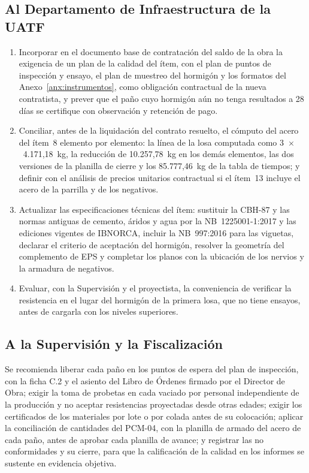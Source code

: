 \subsection{Al Departamento de Infraestructura de la UATF}
\begin{enumerate}[label=(\arabic*)]
  \item Incorporar en el documento base de contratación del saldo de la obra la exigencia de un plan de la calidad del ítem, con el plan de puntos de inspección y ensayo, el plan de muestreo del hormigón y los formatos del Anexo~\ref{anx:instrumentos}, como obligación contractual de la nueva contratista, y prever que el paño cuyo hormigón aún no tenga resultados a 28 días se certifique con observación y retención de pago.
  \item Conciliar, antes de la liquidación del contrato resuelto, el cómputo del acero del ítem~8 elemento por elemento: la línea de la losa computada como 3~$\times$~4.171,18~kg, la reducción de 10.257,78~kg en los demás elementos, las dos versiones de la planilla de cierre y los 85.777,46~kg de la tabla de tiempos; y definir con el análisis de precios unitarios contractual si el ítem~13 incluye el acero de la parrilla y de los negativos.
  \item Actualizar las especificaciones técnicas del ítem: sustituir la CBH-87 y las normas antiguas de cemento, áridos y agua por la NB~1225001-1:2017 y las ediciones vigentes de IBNORCA, incluir la NB~997:2016 para las viguetas, declarar el criterio de aceptación del hormigón, resolver la geometría del complemento de EPS y completar los planos con la ubicación de los nervios y la armadura de negativos.
  \item Evaluar, con la Supervisión y el proyectista, la conveniencia de verificar la resistencia en el lugar del hormigón de la primera losa, que no tiene ensayos, antes de cargarla con los niveles superiores.
\end{enumerate}

\subsection{A la Supervisión y la Fiscalización}
Se recomienda liberar cada paño en los puntos de espera del plan de inspección, con la ficha C.2 y el asiento del Libro de Órdenes firmado por el Director de Obra; exigir la toma de probetas en cada vaciado por personal independiente de la producción y no aceptar resistencias proyectadas desde otras edades; exigir los certificados de los materiales por lote o por colada antes de su colocación; aplicar la conciliación de cantidades del PCM-04, con la planilla de armado del acero de cada paño, antes de aprobar cada planilla de avance; y registrar las no conformidades y su cierre, para que la calificación de la calidad en los informes se sustente en evidencia objetiva.

